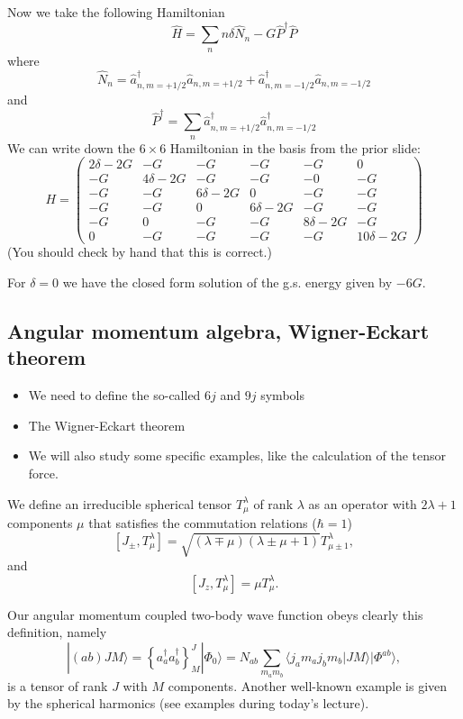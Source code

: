 \documentclass[graybox,sectrefs,envcountresetchap,open=right]{svmonodo}
\begin{document}
\noindent
Now we take the following Hamiltonian
\[
\hat{H} = \sum_n n \delta \hat{N}_n  - G \hat{P}^\dagger \hat{P}
\]
where 
\[
\hat{N}_n = \hat{a}^\dagger_{n, m=+1/2} \hat{a}_{n, m=+1/2} +
\hat{a}^\dagger_{n, m=-1/2} \hat{a}_{n, m=-1/2}
\]
and
\[
\hat{P}^\dagger = \sum_{n} \hat{a}^\dagger_{n, m=+1/2} \hat{a}^\dagger_{n, m=-1/2} 
\]
We can write down the $ 6 \times 6$  Hamiltonian in the basis from the prior slide:
\[
H = \left ( 
\begin{array}{cccccc}
2\delta -2G & -G & -G & -G & -G & 0 \\
 -G & 4\delta -2G & -G & -G & -0 & -G \\
-G & -G & 6\delta -2G & 0 & -G & -G \\
 -G & -G & 0 & 6\delta-2G & -G & -G \\
 -G & 0 & -G & -G & 8\delta-2G & -G \\
0 & -G & -G & -G & -G & 10\delta -2G 
\end{array} \right )
\]
(You should check by hand that this is correct.) 

For $\delta = 0$ we have the closed form solution of  the g.s. energy given by $-6G$.










\subsection{Angular momentum algebra, Wigner-Eckart theorem}

\begin{itemize}
\item We need to define the so-called $6j$ and $9j$ symbols

\item The Wigner-Eckart theorem

\item We will also study  some specific examples, like the calculation of the tensor force.
\end{itemize}

\noindent
We define an irreducible  spherical tensor $T^{\lambda}_{\mu}$ of rank $\lambda$ as an operator with $2\lambda+1$ components $\mu$ 
that satisfies the commutation relations ($\hbar=1$)
\[
[J_{\pm}, T^{\lambda}_{\mu}]= \sqrt{(\lambda\mp \mu)(\lambda\pm \mu+1)}T^{\lambda}_{\mu\pm 1},
\]
and
\[
[J_{z}, T^{\lambda}_{\mu}]=\mu T^{\lambda}_{\mu}.
\]

Our angular momentum coupled two-body wave function obeys clearly this definition, namely
\[
|(ab)JM\rangle  = \left\{a^{\dagger}_aa^{\dagger}_b\right\}^J_M|\Phi_0\rangle=N_{ab}\sum_{m_am_b}\langle j_am_aj_bm_b|JM\rangle|\Phi^{ab}\rangle, 
\]
is a tensor of rank $J$ with $M$ components. Another well-known example is given by the spherical harmonics (see examples during today's lecture). 
\end{document}
